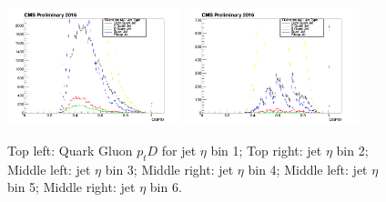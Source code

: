 \begin{figure}[htbp]
\begin{center}
  \includegraphics[width=0.45\textwidth]{sections/mc4/TopTagger/figures/_b_qgptdjetetabin4_.png}
  \includegraphics[width=0.45\textwidth]{sections/mc4/TopTagger/figures/_b_qgptdjetetabin5_.png}
 \end{center}
 \caption{Top left: Quark Gluon $p_{t}D$ for jet $\eta$ bin 1; Top right: jet $\eta$ bin 2; Middle left: jet $\eta$ bin 3; Middle right: jet $\eta$ bin 4; Middle left: jet $\eta$ bin 5; Middle right: jet $\eta$ bin 6.}
 \label{fig:c4ttqgptdjeteta}
\end{figure}

